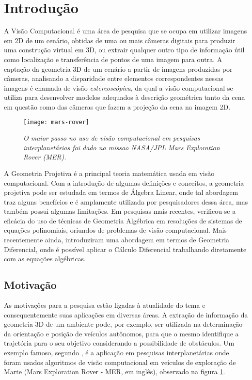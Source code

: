 \pagestyle{headings}
\section{Introdução}
A Visão Computacional é uma área de pesquisa que se ocupa em utilizar imagens em 2D de um cenário, obtidas de uma ou mais câmeras digitais para produzir uma construção virtual em 3D, ou extrair qualquer outro tipo de informação útil como localização e transferência de pontos de uma imagem para outra. A captação da geometria 3D de um cenário a partir de imagens produzidas por câmeras, analisando a disparidade entre elementos correspondentes nessas imagens é chamada de visão {\it estereoscópica}, da qual a visão computacional se utiliza para desenvolver modelos adequados à descrição geométrica tanto da cena em questão como das câmeras que fazem a projeção da cena na imagem 2D.  

\begin{figure}[!htb]
\centering
\texttt{[image: mars-rover]}
\caption{{\it O maior passo no uso de visão computacional em pesquisas interplanetárias foi dado na missao NASA/JPL Mars Exploration Rover (MER).}}
\label{fig.mars-rover}
\end{figure}

A Geometria Projetiva é a principal teoria matemática usada em visão computacional. Com a introdução de algumas definições e conceitos, a geometria projetiva pode ser estudada em termos de Álgebra Linear, onde tal abordagem traz alguns benefícios e é amplamente utilizada por pesquisadores dessa área, mas também possui algumas limitações. Em pesquisas mais recentes, verificou-se a eficácia do uso de técnicas de Geometria Algébrica em resoluções de sistemas de equações polinomiais, oriundos de problemas de visão computacional. Mais recentemente ainda, \citep{tese-fabbri} introduziram uma abordagem em termos de Geometria Diferencial, onde é possível aplicar o Cálculo Diferencial trabalhando diretamente com as equações algébricas.


\subsection{Motivação}
As motivações para a pesquisa estão ligadas à atualidade do tema e consequentemente suas aplicações em diversas áreas. A extração de informação da geometria 3D de um ambiente pode, por exemplo, ser utilizada na determinação da orientação e posição de veículos autônomos, para que o mesmo identifique a trajetória para o seu objetivo considerando a possibilidade de obstáculos. Um exemplo famoso, segundo \citep{mars-rover}, é a aplicação em pesquisas interplanetárias onde foram usados algoritmos de visão computacional em veículos de exploração de Marte (Mars Exploration Rover - MER, em inglês), observado na figura \ref{fig.mars-rover}.


